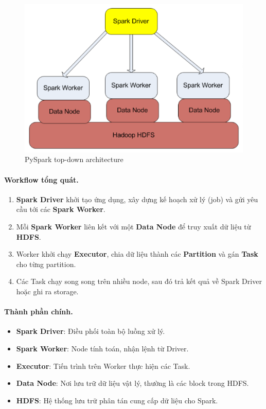 \documentclass[11pt]{article}
\begin{document}
\begin{figure}[H]
    \centering
    \includegraphics[width=0.65\linewidth]{images/pySpark_highlevel.png}
    \caption{PySpark top-down architecture}
\end{figure}

\paragraph{Workflow tổng quát.}
\begin{enumerate}
    \item \textbf{Spark Driver} khởi tạo ứng dụng, xây dựng kế hoạch xử lý (job) và gửi yêu cầu tới các \textbf{Spark Worker}.
    \item Mỗi \textbf{Spark Worker} liên kết với một \textbf{Data Node} để truy xuất dữ liệu từ \textbf{HDFS}.
    \item Worker khởi chạy \textbf{Executor}, chia dữ liệu thành các \textbf{Partition} và gán \textbf{Task} cho từng partition.
    \item Các Task chạy song song trên nhiều node, sau đó trả kết quả về Spark Driver hoặc ghi ra storage.
\end{enumerate}

\paragraph{Thành phần chính.}
\begin{itemize}
    \item \textbf{Spark Driver}: Điều phối toàn bộ luồng xử lý.
    \item \textbf{Spark Worker}: Node tính toán, nhận lệnh từ Driver.
    \item \textbf{Executor}: Tiến trình trên Worker thực hiện các Task.
    \item \textbf{Data Node}: Nơi lưu trữ dữ liệu vật lý, thường là các block trong HDFS.
    \item \textbf{HDFS}: Hệ thống lưu trữ phân tán cung cấp dữ liệu cho Spark.
\end{itemize}
\end{document}
